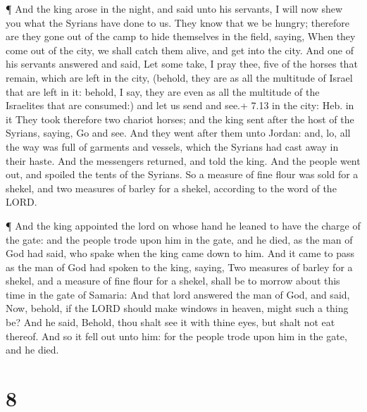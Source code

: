  ¶ And the king arose in the night, and said unto his
servants, I will now shew you what the Syrians have done to us. They
know that we be hungry; therefore are they gone out of the camp to hide
themselves in the field, saying, When they come out of the city, we
shall catch them alive, and get into the city.  And one of
his servants answered and said, Let some take, I pray thee, five of the
horses that remain, which are left in the city, (behold, they are as all
the multitude of Israel that are left in it: behold, I say, they are
even as all the multitude of the Israelites that are consumed:) and let
us send and see.+ 7.13 in the city: Heb. in it  They took
therefore two chariot horses; and the king sent after the host of the
Syrians, saying, Go and see.  And they went after them unto
Jordan: and, lo, all the way was full of garments and vessels, which the
Syrians had cast away in their haste. And the messengers returned, and
told the king.  And the people went out, and spoiled the
tents of the Syrians. So a measure of fine flour was sold for a shekel,
and two measures of barley for a shekel, according to the word of the
LORD.

 ¶ And the king appointed the lord on whose hand he leaned
to have the charge of the gate: and the people trode upon him in the
gate, and he died, as the man of God had said, who spake when the king
came down to him.  And it came to pass as the man of God
had spoken to the king, saying, Two measures of barley for a shekel, and
a measure of fine flour for a shekel, shall be to morrow about this time
in the gate of Samaria:  And that lord answered the man of
God, and said, Now, behold, if the LORD should make windows in heaven,
might such a thing be? And he said, Behold, thou shalt see it with thine
eyes, but shalt not eat thereof.  And so it fell out unto
him: for the people trode upon him in the gate, and he died.

\hypertarget{section-7}{%
\section{8}\label{section-7}}

